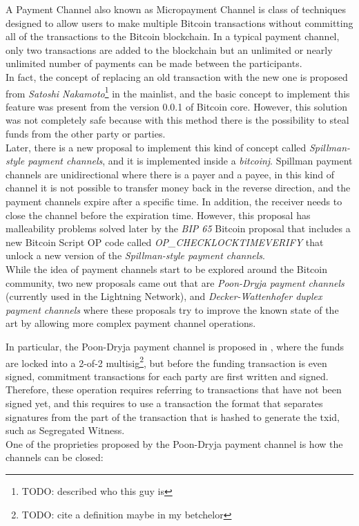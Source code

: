 A Payment Channel also known as Micropayment Channel is class of techniques designed to allow users to make multiple
Bitcoin transactions without committing all of the transactions to the Bitcoin blockchain. In a typical payment channel,
only two transactions are added to the blockchain but an unlimited or nearly unlimited number of payments
can be made between the participants.\\
In fact, the concept of replacing an old transaction with the new one is proposed from \emph{Satoshi Nakamoto}\footnote{TODO: described who this guy is} in the mainlist\cite{payment-channels-satoshi}, and
the basic concept to implement this feature was present from the version 0.0.1 of Bitcoin core. However, this solution
was not completely safe because with this method there is the possibility to steal funds from the other party or parties.\\

Later, there is a new proposal to implement this kind of concept called \emph{Spillman-style payment channels}, and it is
implemented inside a \emph{bitcoinj}\cite{bitcoinj-impl}. Spillman payment channels are unidirectional where
there is a payer and a payee, in this kind of channel it is not possible to transfer money back in the reverse direction, and the payment
channels expire after a specific time.
In addition, the receiver needs to close the channel before the expiration time.
However, this proposal has malleability problems solved later by the \emph{BIP  65}\cite{bip65} Bitcoin proposal that includes a new Bitcoin Script OP code
called \emph{OP\_CHECKLOCKTIMEVERIFY} that unlock a new version of the \emph{Spillman-style payment channels}.\\
While the idea of payment channels start to be explored around the Bitcoin community, two new proposals came out that are
\emph{Poon-Dryja payment channels}\cite{lightning-network-paper} (currently used in the Lightning Network),
and \emph{Decker-Wattenhofer duplex payment channels}\cite{Decker2015fast} where these proposals try to improve the known state
of the art by allowing more complex payment channel operations.

In particular, the Poon-Dryja payment channel is proposed in \cite{lightning-network-paper}, where
the funds are locked into a 2-of-2 multisig\footnote{TODO: cite a definition maybe in my betchelor},
but before the funding transaction is even signed, commitment transactions for each party are first written and signed.\\
Therefore, these operation requires referring to transactions that have not been signed yet, and this requires to use a transaction
the format that separates signatures from the part of the transaction that is hashed to generate the txid, such as Segregated Witness.\\
One of the proprieties proposed by the Poon-Dryja payment channel is how the channels can be closed:


